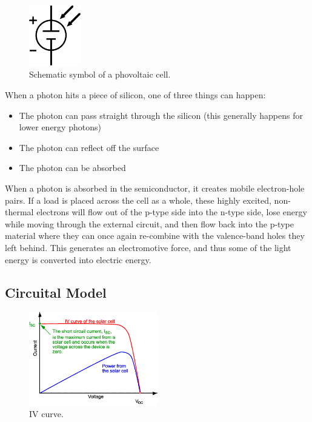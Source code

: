\documentclass[11pt]{article} %
\begin{document}
\begin{figure}
	\centering
	\includegraphics[width=0.2\textwidth]{img/Photovoltaic_cell.png}
	\caption{Schematic symbol of a phovoltaic cell.}
	\vspace{-10pt}
\end{figure}

When a photon hits a piece of silicon, one of three things can happen:  
\begin{itemize}
	\item The photon can pass straight through the silicon (this generally happens for lower energy photons) 
	\item The photon can reflect off the surface 
	\item The photon can be absorbed 
\end{itemize}

When a photon is absorbed in the semiconductor, it creates mobile electron-hole pairs. If a load is placed across the cell as a whole, these highly excited, non-thermal electrons will flow out of the p-type side into the n-type side, lose energy while moving through the external circuit, and then flow back into the p-type material where they can once again re-combine with the valence-band holes they left behind. This generates an electromotive force, and thus some of the light energy is converted into electric energy.

\subsection {Circuital Model}
%

\begin{figure}
	\centering
	\includegraphics[width=0.5\textwidth]{img/IV-ISC.png}
	\caption{IV curve.}
\end{figure}
\end{document}
